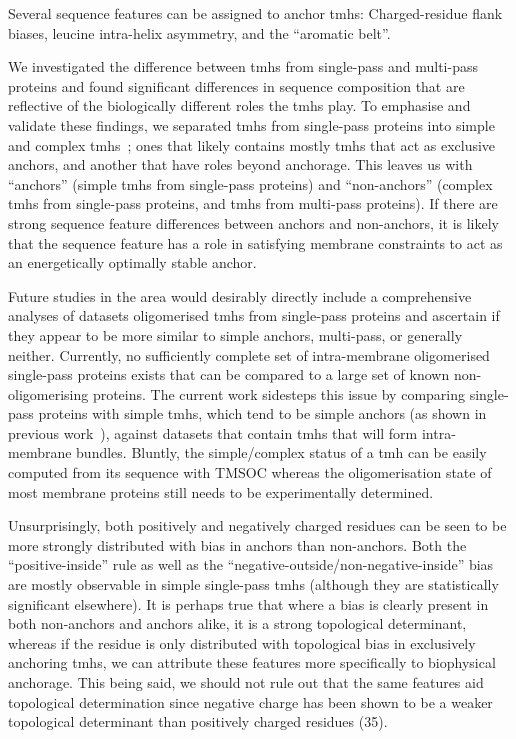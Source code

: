 Several sequence features can be assigned to anchor \gls{tmh}s: Charged-residue flank biases, leucine intra-helix asymmetry, and the “aromatic belt”.

We investigated the difference between \gls{tmh}s from single-pass and multi-pass proteins and found significant differences in sequence composition that are reflective of the biologically different roles the \gls{tmh}s play. To emphasise and validate these findings, we separated \gls{tmh}s from single-pass proteins into simple and complex \gls{tmh}s~\cite{Wong2011, Wong2012}; ones that likely contains mostly \gls{tmh}s that act as exclusive anchors, and another that have roles beyond anchorage. This leaves us with ``anchors'' (simple \gls{tmh}s from single-pass proteins) and “non-anchors” (complex \gls{tmh}s from single-pass proteins, and \gls{tmh}s from multi-pass proteins). If there are strong sequence feature differences between anchors and non-anchors, it is likely that the sequence feature has a role in satisfying membrane constraints to act as an energetically optimally stable anchor.

Future studies in the area would desirably directly include a comprehensive analyses of datasets oligomerised \gls{tmh}s from single-pass proteins and ascertain if they appear to be more similar to simple anchors, multi-pass, or generally neither. Currently, no sufficiently complete set of intra-membrane oligomerised single-pass proteins exists that can be compared to a large set of known non-oligomerising proteins. The current work sidesteps this issue by comparing single-pass proteins with simple \gls{tmh}s, which tend to be simple anchors (as shown in previous work~\cite{Wong2011, Wong2012}), against datasets that contain \gls{tmh}s that will form intra-membrane bundles. Bluntly, the simple/complex status of a \gls{tmh} can be easily computed from its sequence with TMSOC whereas the oligomerisation state of most membrane proteins still needs to be experimentally determined.

Unsurprisingly, both positively and negatively charged residues can be seen to be more strongly distributed with bias in anchors than non-anchors. Both the “positive-inside” rule as well as the “negative-outside/non-negative-inside” bias are mostly observable in simple single-pass \gls{tmh}s (although they are statistically significant elsewhere). It is perhaps true that where a bias is clearly present in both non-anchors and anchors alike, it is a strong topological determinant, whereas if the residue is only distributed with topological bias in exclusively anchoring \gls{tmh}s, we can attribute these features more specifically to biophysical anchorage. This being said, we should not rule out that the same features aid topological determination since negative charge has been shown to be a weaker topological determinant than positively charged residues (35).


